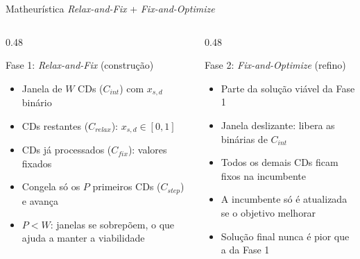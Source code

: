 \documentclass[aspectratio=169,11pt]{beamer}
\begin{document}

\begin{frame}{Matheurística \textit{Relax-and-Fix} + \textit{Fix-and-Optimize}}
  \begin{columns}[T]
    \begin{column}{0.48\textwidth}
      \begin{block}{Fase 1: \textit{Relax-and-Fix} (construção)}
        \begin{itemize}
          \item Janela de $W$ CDs ($C_{int}$) com $x_{s,d}$ binário
          \item CDs restantes ($C_{relax}$): $x_{s,d}\in[0,1]$
          \item CDs já processados ($C_{fix}$): valores fixados
          \item Congela só os $P$ primeiros CDs ($C_{step}$) e avança
          \item $P<W$: janelas se sobrepõem, o que ajuda a manter a viabilidade
        \end{itemize}
      \end{block}
    \end{column}

    \begin{column}{0.48\textwidth}
      \begin{block}{Fase 2: \textit{Fix-and-Optimize} (refino)}
        \begin{itemize}
          \item Parte da solução viável da Fase 1
          \item Janela deslizante: libera as binárias de $C_{int}$
          \item Todos os demais CDs ficam fixos na incumbente
          \item A incumbente só é atualizada se o objetivo melhorar
          \item Solução final nunca é pior que a da Fase 1
        \end{itemize}
      \end{block}
    \end{column}
  \end{columns}
\end{frame}
\end{document}
